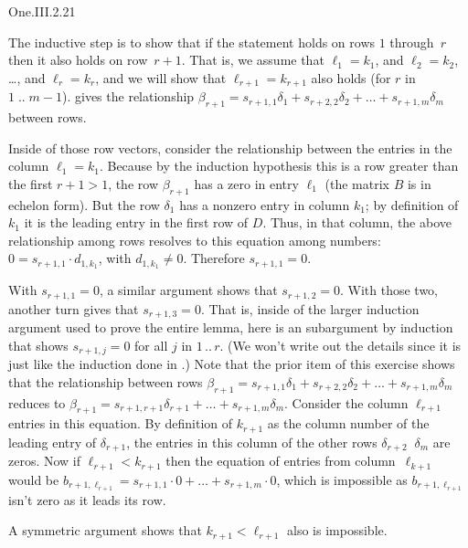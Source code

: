 \begin{ans}{One.III.2.21}
      \begin{exparts}
        \partsitem The inductive step is to show that if
          the statement holds on rows $1$ through~$r$ then it also holds on
          row~$r+1$.
          That is, we assume that $\ell_1=k_1$, and
          $\ell_2=k_2$, \ldots, and $\ell_r=k_r$,
          and we will show that $\ell_{r+1}=k_{r+1}$ also holds
          (for $r$ in $1\;..\;m-1$).
        \partsitem
           gives the
          relationship
          $\beta_{r+1}=s_{r+1,1}\delta_1+s_{r+2,2}\delta_2
             +\dots+s_{r+1,m}\delta_m$
          between rows.

          Inside of those row vectors, consider the relationship between
          the entries in the column $\ell_1=k_1$.
          Because by the induction hypothesis this is a row greater than the
          first $r+1>1$, the row $\beta_{r+1}$ has a zero in entry $\ell_1$
          (the matrix $B$ is in echelon form).
          But the row $\delta_1$
          has a nonzero entry in column $k_1$; by definition of
          $k_1$ it is the leading entry in the first row of $D$.
          Thus, in that column, the above relationship among rows resolves
          to this equation among numbers: $0=s_{r+1,1}\cdot d_{1,k_1}$,
          with $d_{1,k_1}\neq 0$.
          Therefore $s_{r+1,1}=0$.

          With $s_{r+1,1}=0$, a similar argument shows that
          $s_{r+1,2}=0$.
          With those two, another turn gives that $s_{r+1,3}=0$.
          That is, inside of the larger induction argument used to
          prove the entire lemma, here is an subargument by induction
          that shows $s_{r+1,j}=0$ for all $j$ in $1\,..\,r$.
          (We won't write out the details since it is just like
          the induction done in .)
        \partsitem
          Note that the prior item of this exercise shows that the relationship
          between rows
          $\beta_{r+1}=s_{r+1,1}\delta_1+s_{r+2,2}\delta_2
             +\dots+s_{r+1,m}\delta_m$
          reduces to
          $\beta_{r+1}=s_{r+1,r+1}\delta_{r+1}+\dots+s_{r+1,m}\delta_m$.
          Consider the column $\ell_{r+1}$ entries in this equation.
          By definition of $k_{r+1}$ as the column number of the leading
          entry of $\delta_{r+1}$, the entries in this column of the other rows
          $\delta_{r+2}\;\;\delta_{m}$ are zeros.
          Now if $\ell_{r+1}<k_{r+1}$
          then the equation of entries from
          column~$\ell_{k+1}$ would be
          $b_{r+1,\ell_{r+1}}=s_{r+1,1}\cdot 0+\dots+s_{r+1,m}\cdot 0$,
          which is impossible as $b_{r+1,\ell_{r+1}}$ isn't zero as it leads
          its row.

          A symmetric argument
          shows that $k_{r+1}<\ell_{r+1}$ also is impossible.
      \end{exparts}
    
\end{ans}
